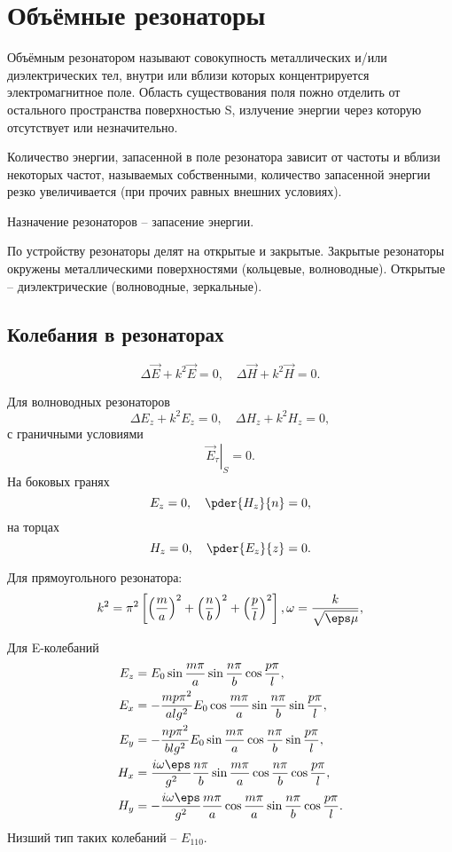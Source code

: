 \chapter{Объёмные резонаторы}

Объёмным резонатором называют совокупность металлических и/или диэлектрических тел, внутри или вблизи которых концентрируется электромагнитное поле. Область существования поля пожно отделить от остального пространства поверхностью S, излучение энергии через которую отсутствует или незначительно.

Количество энергии, запасенной в поле резонатора зависит от частоты и вблизи некоторых частот, называемых собственными, количество запасенной энергии резко увеличивается (при прочих равных внешних условиях).

Назначение резонаторов -- запасение энергии.

По устройству резонаторы делят на открытые и закрытые. Закрытые резонаторы окружены металлическими поверхностями (кольцевые, волноводные). Открытые -- диэлектрические (волноводные, зеркальные).


\section{Колебания в резонаторах}
\[
	\Delta\vec{E} + k^2\vec{E} = 0,\quad
	\Delta\vec{H} + k^2\vec{H} = 0.
\]

Для волноводных резонаторов
\[
	\Delta E_z + k^2 E_z = 0,\quad
	\Delta H_z + k^2 H_z = 0,
\]
с граничными условиями
\[
	\left.\vec{E}_\tau\right|_S = 0.
\]
На боковых гранях
\[
	E_z = 0,\quad \pder{H_z}{n} = 0,
\]
на торцах
\[
	H_z = 0,\quad \pder{E_z}{z} = 0.
\]

Для прямоугольного резонатора:
\[
	k^2 = \pi^2\left[\left(\frac{m}{a}\right)^2+
					 \left(\frac{n}{b}\right)^2+
					 \left(\frac{p}{l}\right)^2\right],
	\omega = \frac{k}{\sqrt{\eps\mu}},
\]


Для E-колебаний
\begin{align*}
	E_z & = E_0\sin\frac{m\pi}{a}\sin\frac{n\pi}{b}\cos\frac{p\pi}{l},\\
	E_x & = -\frac{mp\pi^2}{al g^2}E_0\cos\frac{m\pi}{a}\sin\frac{n\pi}{b}\sin\frac{p\pi}{l},\\
	E_y & = -\frac{np\pi^2}{bl g^2}E_0\sin\frac{m\pi}{a}\cos\frac{n\pi}{b}\sin\frac{p\pi}{l},\\
	H_x & = \frac{i\omega\eps}{g^2}\frac{n\pi}{b}\sin\frac{m\pi}{a}\cos\frac{n\pi}{b}\cos\frac{p\pi}{l},\\
	H_y & = -\frac{i\omega\eps}{g^2}\frac{m\pi}{a}\cos\frac{m\pi}{a}\sin\frac{n\pi}{b}\cos\frac{p\pi}{l}.
\end{align*}
Низший тип таких колебаний -- \(E_{110}\).

